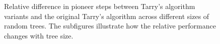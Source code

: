 \begin{figure}[H]
    \centering
    \qquad
    \qquad
    \newline
    \qquad 
    \newline
    \caption{Relative difference in pioneer steps between Tarry's algorithm variants and the original Tarry's algorithm across different sizes of random trees. The subfigures illustrate how the relative performance changes with tree size.} 
    \label{fig_tarry_steps_relative_all_sizes_tree}
\end{figure}

